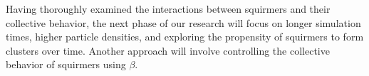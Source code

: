 \documentclass{article}
\begin{document}
Having thoroughly examined the interactions between squirmers and their collective behavior, 
the next phase of our research will focus on longer simulation times, higher particle densities, 
and exploring the propensity of squirmers to form clusters over time.
Another approach will involve controlling the collective behavior of squirmers using $\beta$.
\newpage

\nocite{*}


\end{document}
